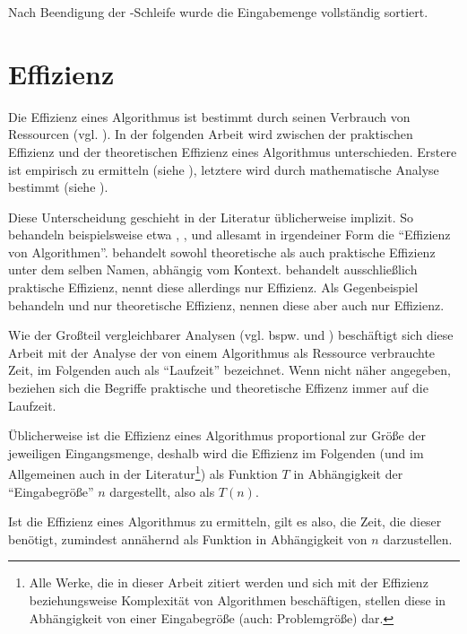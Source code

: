 Nach Beendigung der \For-Schleife wurde die Eingabemenge vollständig sortiert.

\section{Effizienz}
\label{sec:algo-effizienz}

Die Effizienz eines Algorithmus ist bestimmt durch seinen Verbrauch von Ressourcen (vgl. \cite{rp2013}). In der folgenden Arbeit wird zwischen der praktischen Effizienz und der theoretischen Effizienz eines Algorithmus unterschieden. Erstere ist empirisch zu ermitteln (siehe ), letztere wird durch mathematische Analyse bestimmt (siehe ).

Diese Unterscheidung geschieht in der Literatur üblicherweise implizit. So behandeln beispielsweise etwa \cite{mcg2012}, \cite{llx2012}, \cite{rp2013} und \cite{hsr1997} allesamt in irgendeiner Form die \enquote{Effizienz von Algorithmen}. \cite{mcg2012} behandelt sowohl theoretische als auch praktische Effizienz unter dem selben Namen, abhängig vom Kontext. \cite{llx2012} behandelt ausschließlich praktische Effizienz, nennt diese allerdings nur Effizienz. Als Gegenbeispiel behandeln \cite{rp2013} und \cite{hsr1997} nur theoretische Effizienz, nennen diese aber auch nur Effizienz.

Wie der Großteil vergleichbarer Analysen (vgl. bspw. \cite[23]{clrs2001} und \cite[58]{sha2011}) beschäftigt sich diese Arbeit mit der Analyse der von einem Algorithmus als Ressource verbrauchte Zeit, im Folgenden auch als \enquote{Laufzeit} bezeichnet. Wenn nicht näher angegeben, beziehen sich die Begriffe praktische und theoretische Effizenz immer auf die Laufzeit.

Üblicherweise ist die Effizienz eines Algorithmus proportional zur Größe der jeweiligen Eingangsmenge, deshalb wird die Effizienz im Folgenden (und im Allgemeinen auch in der Literatur\footnote{Alle Werke, die in dieser Arbeit zitiert werden und sich mit der Effizienz beziehungsweise Komplexität von Algorithmen beschäftigen, stellen diese in Abhängigkeit von einer Eingabegröße (auch: Problemgröße) dar.}) als Funktion $T$ in Abhängigkeit der \enquote{Eingabegröße} $n$ dargestellt, also als $T(n)$.

Ist die Effizienz eines Algorithmus zu ermitteln, gilt es also, die Zeit, die dieser benötigt, zumindest annähernd als Funktion in Abhängigkeit von $n$ darzustellen.
